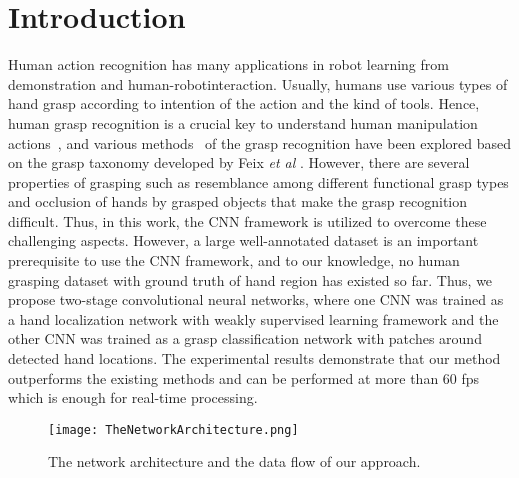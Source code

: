 \documentclass[10pt,twocolumn,letterpaper]{article}
\begin{document}
\section{Introduction}
Human action recognition has many applications in robot learning from demonstration and human-robotinteraction. Usually, humans use various types of hand grasp according to intention of the action and the kind of tools. Hence, human grasp recognition is a crucial key to understand human manipulation actions~\cite{Gupta2016Effectiveness}, and various methods~\cite{Cai2015A} of the grasp recognition have been explored based on the grasp taxonomy developed by Feix \emph{et al} \cite{Feix2016The}. However, there are several properties of grasping such as resemblance among different functional grasp types and occlusion of hands by grasped objects that make the grasp recognition difficult. Thus, in this work, the CNN framework is utilized to overcome these challenging aspects.
However, a large well-annotated dataset is an important prerequisite to use the CNN framework, and to our knowledge, no human grasping dataset with ground truth of hand region has existed so far. Thus, we propose two-stage convolutional neural networks, where one CNN was trained as a
hand localization network with weakly supervised learning framework and the other CNN was trained as a grasp classification network with patches around detected hand
locations. The experimental results demonstrate that our method outperforms the existing methods and can be performed at more than 60 fps which is enough for real-time processing.
\begin{figure}[H]
\begin{center}
\texttt{[image: TheNetworkArchitecture.png]}
\end{center}
   \caption{The network architecture and the data flow of our approach.}
\label{fig:Architecture}
\end{figure}
\end{document}
